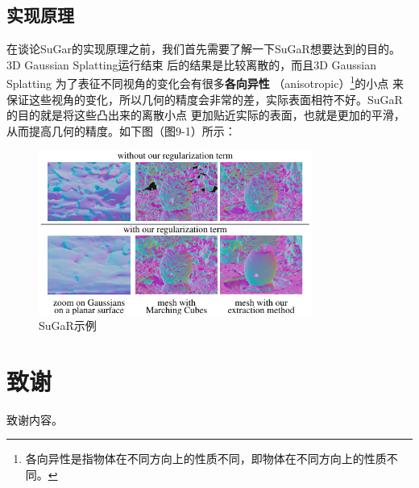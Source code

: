 \documentclass{nwputhesis}
\begin{document}
\subsection{实现原理}
在谈论SuGar的实现原理之前，我们首先需要了解一下SuGaR想要达到的目的。3D Gaussian Splatting运行结束
后的结果是比较离散的，而且3D Gaussian Splatting 为了表征不同视角的变化会有很多\textbf{各向异性}
（anisotropic）\footnote{各向异性是指物体在不同方向上的性质不同，即物体在不同方向上的性质不同。}的小点
来保证这些视角的变化，所以几何的精度会非常的差，实际表面相符不好。SuGaR的目的就是将这些凸出来的离散小点
更加贴近实际的表面，也就是更加的平滑，从而提高几何的精度。如下图（图9-1）所示：
\begin{figure}[H]
    \centering
    \includegraphics[width=0.8\textwidth]{picture/31.png}
    \caption{SuGaR示例}
\end{figure}

\indent










\makespace
\section{致谢}

致谢内容。

\makespace
\end{document}

